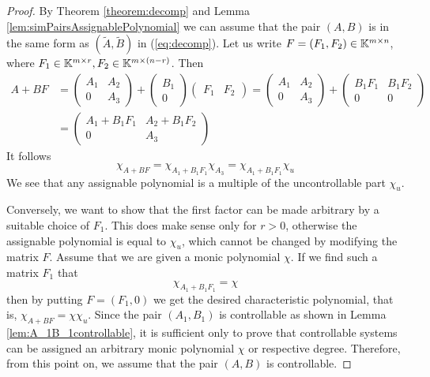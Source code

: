 \begin{proof}
    By Theorem \ref{theorem:decomp} and Lemma \ref{lem:simPairsAssignablePolynomial} we can assume that the pair $(A,B)$ is in the same form as $(\widetilde{A},\widetilde{B})$ in (\ref{eq:decomp}). Let us write $F=(F_1,F_2)\in\mathbb{K}^{m\times n}$, where $F_1\in\mathbb{K}^{m\times r}, F_2\in\mathbb{K}^{m\times (n-r)}$. Then 
    \begin{align*}
        A+BF&=
        \begin{pmatrix}
            A_1 & A_2 \\
            0   & A_3
        \end{pmatrix}
        +
        \begin{pmatrix}
            B_1 \\
            0
        \end{pmatrix}
        \begin{pmatrix}
            F_1 & F_2
        \end{pmatrix}
        =
        \begin{pmatrix}
            A_1 & A_2 \\
            0   & A_3
        \end{pmatrix}
        +
        \begin{pmatrix}
            B_1F_1 & B_1F_2 \\
            0 & 0
        \end{pmatrix}
        \\
        &=
        \begin{pmatrix}
            A_1+B_1F_1 & A_2+B_1F_2 \\
            0 & A_3
        \end{pmatrix}
    \end{align*}
    It follows 
    $$\chi_{A+BF}=\chi_{A_1+B_1F_1}\chi_{A_3}=\chi_{A_1+B_1F_1}\chi_u$$
    We see that any assignable polynomial is a multiple of the uncontrollable part $\chi_u$.

    Conversely, we want to show that the first factor can be made arbitrary by a suitable choice of $F_1$. This does make sense only for $r>0$, otherwise the assignable polynomial is equal to $\chi_u$, which cannot be changed by modifying the matrix $F$. Assume that we are given a monic polynomial $\chi$. If we find such a matrix $F_1$ that 
    $$\chi_{A_1+B_1F_1}=\chi$$
    then by putting $F=(F_1,0)$ we get the desired characteristic polynomial, that is, $\chi_{A+BF}=\chi\chi_u$. Since the pair $(A_1,B_1)$ is controllable as shown in Lemma \ref{lem:A_1B_1controllable}, it is sufficient only to prove that controllable systems can be assigned an arbitrary monic polynomial $\chi$ or respective degree. Therefore, from this point on, we assume that the pair $(A,B)$ is controllable.


\end{proof}
